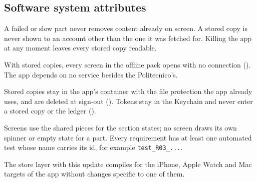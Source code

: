 \subsection{Software system attributes}
\begin{description}[style=nextline, leftmargin=1.5em]
  \item[Reliability] A failed or slow part never removes content already on screen. A stored copy is never shown to an account other than the one it was fetched for. Killing the app at any moment leaves every stored copy readable.
  \item[Availability] With stored copies, every screen in the offline pack opens with no connection (). The app depends on no service besides the Politecnico's.
  \item[Security] Stored copies stay in the app's container with the file protection the app already uses, and are deleted at sign-out (). Tokens stay in the Keychain and never enter a stored copy or the ledger ().
  \item[Maintainability] Screens use the shared pieces for the section states; no screen draws its own spinner or empty state for a part. Every requirement has at least one automated test whose name carries its id, for example \texttt{test\_R03\_...}.
  \item[Portability] The store layer with this update compiles for the iPhone, Apple Watch and Mac targets of the app without changes specific to one of them.
\end{description}
